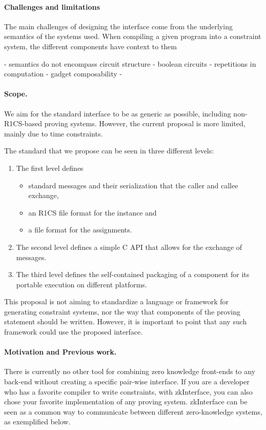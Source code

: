 \documentclass[a4paper,11pt]{article}
\begin{document}
		
		\paragraph{Challenges and limitations}
		
		The main challenges of designing the interface come from the underlying semantics of the systems used. When compiling a given program into a constraint system, the different components have context to them
		
		- semantics do not encompass circuit structure
			- boolean circuits
			- repetitions in computation
		- gadget composability
		- 
		
		\paragraph{Scope.} We aim for the standard interface to be as generic as possible, including non-R1CS-based proving systems. However, the current proposal is more limited, mainly due to time constraints.
		
		The standard that we propose can be seen in three different levels:
		\begin{enumerate}
			\item The first level defines 
			\begin{itemize}
				\item standard messages and their serialization that the caller and callee exchange, 
				\item an R1CS file format for the instance and 
				\item a file format for the assignments.
			\end{itemize}
			\item The second level defines a simple C API that allows for the exchange of messages.
			\item The third level defines the self-contained packaging of a component for its portable execution on different platforms.
		\end{enumerate}

		This proposal is not aiming to standardize a language or framework for generating constraint systems, nor the way that components of the proving statement should be written. However, it is important to point that any such framework could use the proposed interface.
		
		\paragraph{Motivation and Previous work.} There is currently no other tool for combining zero knowledge front-ends to any back-end without creating a specific pair-wise interface. If you are a developer who has a favorite compiler to write constraints, with zkInterface, you can also chose your favorite implementation of any proving system. zkInterface can be seen as a common way to communicate between different zero-knowledge systems, as exemplified below.
		
\end{document}

